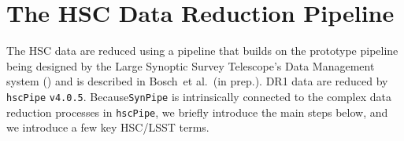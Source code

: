 \documentclass[useamsfonts]{pasj01}
\def\etal{{\ et al.~}}
\def\hscpipe{\texttt{hscPipe}}
\def\synpipe{\texttt{SynPipe}}
\begin{document}

\section{The HSC Data Reduction Pipeline}
    \label{ssec:hscpipe}

The HSC data are reduced using a pipeline that builds on the prototype pipeline being designed by the Large Synoptic Survey Telescope’s Data Management system (\citealt{Ivezic2008, Axelrod2010,
    Juric2015}) and is described in Bosch\etal (in prep.). DR1 data are reduced by \hscpipe{} \texttt{v4.0.5}. Because\synpipe{} is intrinsically connected to the complex data reduction
    processes in \hscpipe{}, we briefly introduce the main steps below, and we introduce a few key HSC/LSST terms.
\end{document}
